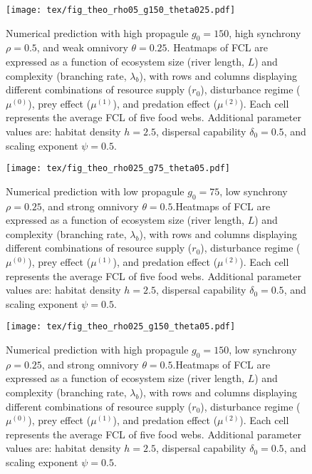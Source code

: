 \begin{figure}
\centering
\texttt{[image: tex/fig\_theo\_rho05\_g150\_theta025.pdf]}
\caption{Numerical prediction with high propagule $g_0 = 150$, high synchrony $\rho = 0.5$, and weak omnivory $\theta = 0.25$. Heatmaps of FCL are expressed as a function of ecosystem size (river length, $L$)
and complexity (branching rate, $\lambda_b$), with rows and columns displaying
different combinations of resource supply ($r_0$), disturbance regime
($\mu^{(0)}$), prey effect ($\mu^{(1)}$), and predation effect ($\mu^{(2)}$).
Each cell represents the average FCL of five food webs.
Additional parameter values are: habitat density $h=2.5$, dispersal capability $\delta_0=0.5$, and scaling exponent $\psi=0.5$.}
\label{fig:fig-num4}
\end{figure}
\newpage

\begin{figure}
\centering
\texttt{[image: tex/fig\_theo\_rho025\_g75\_theta05.pdf]}
\caption{Numerical prediction with low propagule $g_0 = 75$, low synchrony $\rho = 0.25$, and strong omnivory $\theta = 0.5$.Heatmaps of FCL are expressed as a function of ecosystem size (river length, $L$)
and complexity (branching rate, $\lambda_b$), with rows and columns displaying
different combinations of resource supply ($r_0$), disturbance regime
($\mu^{(0)}$), prey effect ($\mu^{(1)}$), and predation effect ($\mu^{(2)}$).
Each cell represents the average FCL of five food webs.
Additional parameter values are: habitat density $h=2.5$, dispersal capability $\delta_0=0.5$, and scaling exponent $\psi=0.5$.}
\label{fig:fig-num5}
\end{figure}
\newpage

\begin{figure}
\centering
\texttt{[image: tex/fig\_theo\_rho025\_g150\_theta05.pdf]}
\caption{Numerical prediction with high propagule $g_0 = 150$, low synchrony $\rho = 0.25$, and strong omnivory $\theta = 0.5$.Heatmaps of FCL are expressed as a function of ecosystem size (river length, $L$)
and complexity (branching rate, $\lambda_b$), with rows and columns displaying
different combinations of resource supply ($r_0$), disturbance regime
($\mu^{(0)}$), prey effect ($\mu^{(1)}$), and predation effect ($\mu^{(2)}$).
Each cell represents the average FCL of five food webs.
Additional parameter values are: habitat density $h=2.5$, dispersal capability $\delta_0=0.5$, and scaling exponent $\psi=0.5$.}
\label{fig:fig-num6}
\end{figure}
\newpage

